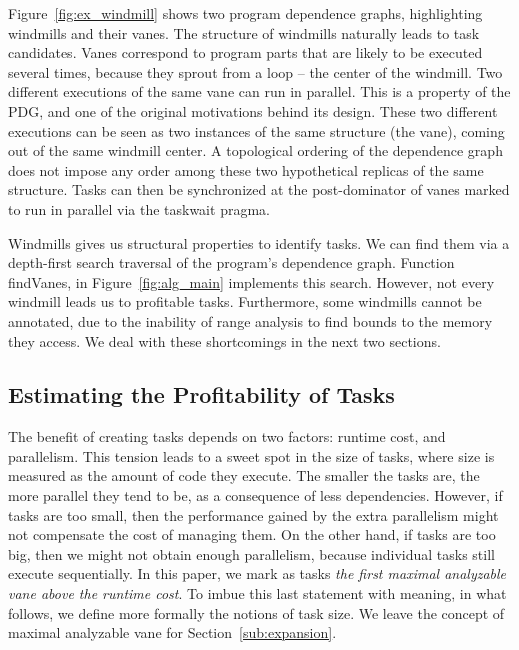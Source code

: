 \documentclass[sigplan,10pt,screen]{acmart}
\begin{document}
Figure~\ref{fig:ex_windmill} shows two program dependence graphs, highlighting
windmills and their vanes.
The structure of windmills naturally leads to task candidates.
Vanes correspond to program parts that are likely to be executed
several times, because they sprout from a loop -- the center of the windmill.
Two different executions of the same vane can run in parallel.
This is a property of the PDG, and one of the original motivations behind its
design.
These two different executions can be seen as two instances of the same
structure (the vane), coming out of the same windmill center.
A topological ordering of the dependence graph does not impose any order among
these two hypothetical replicas of the same structure.
Tasks can then be synchronized at the post-dominator of vanes marked to run in parallel
via the \textsf{taskwait} pragma.

Windmills gives us structural properties to identify tasks.
We can find them via a depth-first search traversal of the program's dependence
graph.
Function \textsf{findVanes}, in Figure~\ref{fig:alg_main} implements this
search.
However, not every windmill leads us to profitable tasks.
Furthermore, some windmills cannot be annotated, due to the inability of
range analysis to find bounds to the memory they access.
We deal with these shortcomings in the next two sections.

\subsection{Estimating the Profitability of Tasks}
\label{sub:profit}

The benefit of creating tasks depends on two factors:
runtime cost, and parallelism.
This tension leads to a sweet spot in the size of tasks, where size is
measured as the amount of code they execute.
The smaller the tasks are, the more parallel they tend to be, as a consequence
of less dependencies.
However, if tasks are too small, then the performance gained by the extra
parallelism might not compensate the cost of managing them.
On the other hand, if tasks are too big, then we might not obtain enough
parallelism, because individual tasks still execute sequentially.
In this paper, we mark as tasks {\em the first maximal analyzable vane above the
runtime cost}.
To imbue this last statement with meaning, in what follows, we define more
formally the notions of task size.
We leave the concept of maximal analyzable vane for Section~\ref{sub:expansion}.
\end{document}
